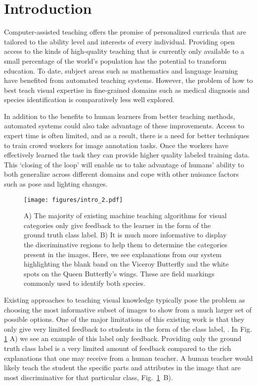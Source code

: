 \documentclass[../main.tex]{subfiles}
\begin{document}
    
\vspace{-5pt}
\section{Introduction}
Computer-assisted teaching offers the promise of personalized curricula that are tailored to the ability level and interests of every individual. 
Providing open access to the kinds of high-quality teaching that is currently only available to a small percentage of the world's population has the potential to transform education.
To date, subject areas such as mathematics \cite{koedinger1997intelligent,canfield2001aleks} and language learning \cite{von2013duolingo} have benefited from automated teaching systems. 
However, the problem of how to best teach visual expertise in fine-grained domains such as medical diagnosis and species identification is comparatively less well explored.   


In addition to the benefits to human learners from better teaching methods, automated systems could also take advantage of these improvements.
Access to expert time is often limited, and as a result, there is a need for better techniques to train crowd workers for image annotation tasks.
Once the workers have effectively learned the task they can provide higher quality labeled training data. 
This `closing of the loop' will enable us to take advantage of humans' ability to both generalize across different domains and cope with other nuisance factors such as pose and lighting changes. 

\begin{figure}[t]
    \centering
    \texttt{[image: figures/intro\_2.pdf]}
    \caption{A) The majority of existing machine teaching algorithms for visual categories only give feedback to the learner in the form of the ground truth class label. 
    B) It is much more informative to display the discriminative regions to help them to determine the categories present in the images. Here, we see explanations from our system highlighting the blank band on the Viceroy Butterfly and the white spots on the Queen Butterfly's wings. These are field markings commonly used to identify both species.}
    \label{interp_feedback_fig}
\end{figure}


Existing approaches to teaching visual knowledge typically pose the problem as choosing the most informative subset of images to show from a much larger set of possible options. 
One of the major limitations of this existing work is that they only give very limited feedback to students in the form of the class label, \eg \cite{singla2014near,johns2015}. 
In Fig. \ref{interp_feedback_fig}  A) we see an example of this label only feedback. 
Providing only the ground truth class label is a very limited amount of feedback compared to the rich explanations that one may receive from a human teacher. 
A human teacher would likely teach the student the specific parts and attributes in the image that are most discriminative for that particular class, Fig.~\ref{interp_feedback_fig}~B). 
\end{document}

